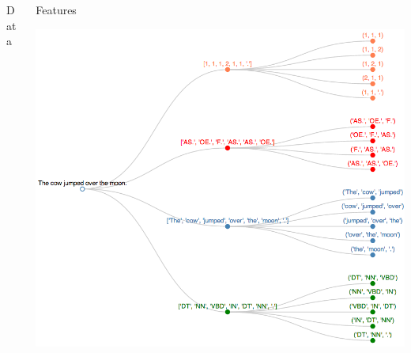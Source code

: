 \documentclass[final]{beamer}
\newlength{\onecolwid}
\newlength{\twocolwid}
\begin{document}
\begin{frame}[t]
\begin{columns}[t]
\begin{column}{\twocolwid}
\begin{columns}[t,totalwidth=\twocolwid]
\begin{column}{\onecolwid}
\begin{block}{Data}
\end{block}


\end{column} %

\begin{column}{\onecolwid}\vspace{-.6in} %


\begin{block}{Features}

\begin{center}
\includegraphics[width=\linewidth]{dendrogram.png}
\end{center}

\end{block}


\end{column} %

\end{columns} %


\end{column}
\end{columns}
\end{frame}
\end{document}
